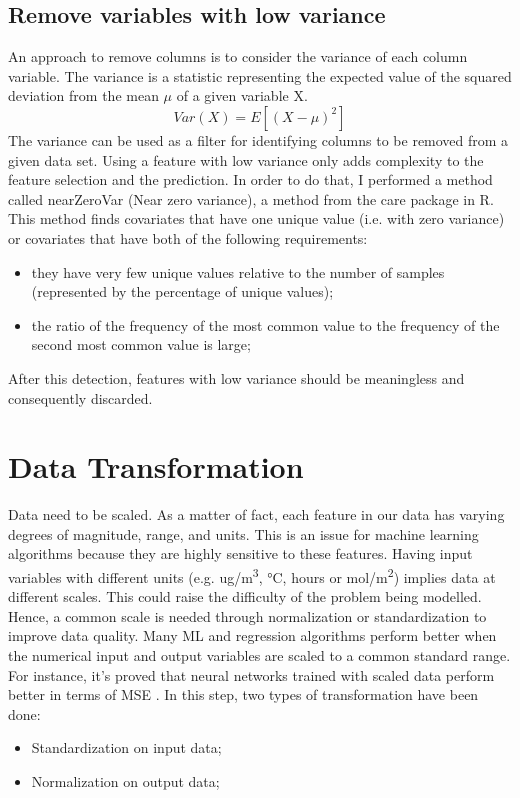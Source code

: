 \subsection{Remove variables with low variance}
An approach to remove columns is to consider the variance of each column variable. The variance is a statistic representing the expected value of the squared deviation from the mean $\mu$ of a given variable X. 
\begin{equation}
  Var(X) = E[(X-\mu)^2]
\end{equation}
The variance can be used as a filter for identifying columns to be removed from a given data set. 
Using a feature with low variance only adds complexity to the feature selection and the prediction.\newline
In order to do that, I performed a method called nearZeroVar (Near zero variance), a method from the \gls{care} package in R.
This method finds covariates that have one unique value (i.e. with zero variance) or covariates that have both of the following requirements:
\begin{itemize}
\item they have very few unique values relative to the number of samples (represented by the percentage of unique values);
\item the ratio of the frequency of the most common value to the frequency of the second most common value is large;
\end{itemize}
After this detection, features with low variance should be meaningless and consequently discarded. 
\section{Data Transformation}
Data need to be scaled. As a matter of fact, each feature in our data has varying degrees of magnitude, range, and units. This is an issue for machine learning algorithms because they are highly sensitive to these features. 
Having input variables with different units (e.g. ug/m\textsuperscript{3}, °C, hours or mol/m\textsuperscript{2}) implies data at different scales. This could raise the difficulty of the problem being modelled. \newline
Hence, a common scale is needed through normalization or standardization to improve data quality.\newline
Many ML and regression algorithms perform better when the numerical input and output variables are scaled to a common standard range. \newline
For instance, it's proved that neural networks trained with scaled data perform better in terms of MSE \cite{shanker1996effect}.
In this step, two types of transformation have been done:
\begin{itemize}
    \item Standardization on input data;
    \item Normalization on output data;
\end{itemize}
